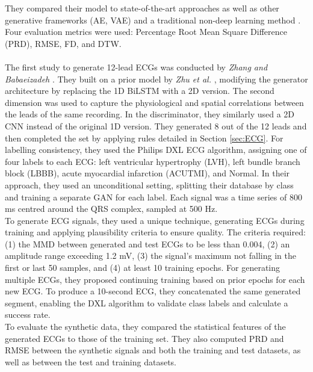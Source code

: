 They compared their model to state-of-the-art approaches \cite{zhu_electrocardiogram_2019} as well as other generative frameworks (AE, VAE) and a traditional non-deep learning method \cite{mcsharry_dynamical_2003}. Four evaluation metrics were used: Percentage Root Mean Square Difference (PRD), RMSE, FD, and DTW.
\\ \\
The first study to generate 12-lead ECGs was conducted by \textit{Zhang and Babaeizadeh} \cite{zhang_synthesis_2021}. They built on a prior model by \textit{Zhu et al.} \cite{zhu_electrocardiogram_2019}, modifying the generator architecture by replacing the 1D BiLSTM with a 2D version. The second dimension was used to capture the physiological and spatial correlations between the leads of the same recording. In the discriminator, they similarly used a 2D CNN instead of the original 1D version. They generated 8 out of the 12 leads and then completed the set by applying rules detailed in Section \ref{sec:ECG}. For labelling consistency, they used the Philips DXL ECG algorithm, assigning one of four labels to each ECG: left ventricular hypertrophy (LVH), left bundle branch block (LBBB), acute myocardial infarction (ACUTMI), and Normal. 
In their approach, they used an unconditional setting, splitting their database by class and training a separate GAN for each label. Each signal was a time series of 800 ms centred around the QRS complex, sampled at 500 Hz. 
\\
To generate ECG signals, they used a unique technique, generating ECGs during training and applying plausibility criteria to ensure quality. The criteria required: (1) the MMD between generated and test ECGs to be less than 0.004, (2) an amplitude range exceeding 1.2 mV, (3) the signal's maximum not falling in the first or last 50 samples, and (4) at least 10 training epochs. For generating multiple ECGs, they proposed continuing training based on prior epochs for each new ECG. To produce a 10-second ECG, they concatenated the same generated segment, enabling the DXL algorithm to validate class labels and calculate a success rate.
\\
To evaluate the synthetic data, they compared the statistical features of the generated ECGs to those of the training set. They also computed PRD and RMSE between the synthetic signals and both the training and test datasets, as well as between the test and training datasets.
\\ \\
